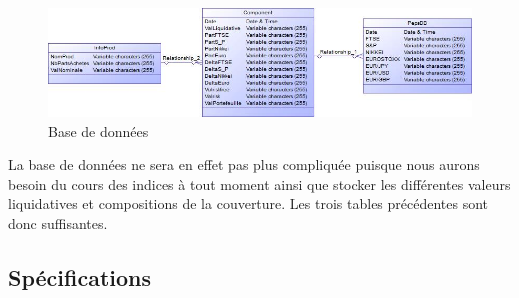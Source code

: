 \documentclass[french,12pt,a4paper]{article}
\begin{document}
\begin{figure}[h!]
  \caption{Base de données}
  \centering
    \includegraphics[scale=0.8]{BD.jpg}
\end{figure}

La base de données ne sera en effet pas plus compliquée puisque nous aurons besoin du cours des indices à tout moment ainsi que stocker les différentes valeurs liquidatives et compositions de la couverture. Les trois tables précédentes sont donc suffisantes.



\subsection{Spécifications}
\end{document}
